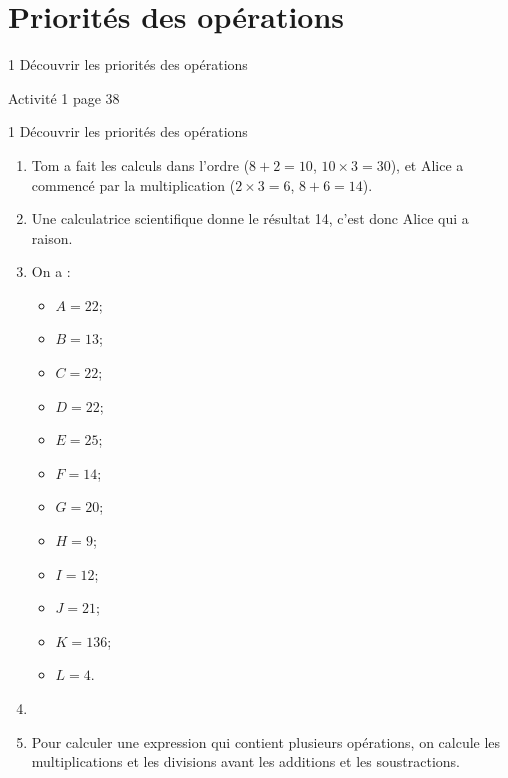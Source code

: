 \documentclass[12pt,a4paper]{article}
\date{}
\title{}
\begin{document}




\section{Priorités des opérations}

\begin{myact}{1 Découvrir les priorités des opérations}

	Activité 1 page 38
\end{myact}

\begin{myactrep}{1 Découvrir les priorités des opérations}
	
	\begin{enumerate}
		\item Tom a fait les calculs dans l'ordre ($8 + 2 = 10$, $10 \times 3 = 30$), et Alice a commencé par la multiplication ($2 \times 3 = 6$, $8 + 6 = 14$).
		
		\item Une calculatrice scientifique donne le résultat 14, c'est donc Alice qui a raison.
		
		\item On a :
		
		\begin{multicols}{4}
			\begin{itemize}
				\item $A = 22 $;
				\item $B = 13 $;
				\item $C = 22 $;
				\item $D = 22 $;
				\item $E = 25 $;
				\item $F = 14 $;
				\item $G = 20 $;
				\item $H = 9 $;
				\item $I = 12 $;
				\item $J = 21 $;
				\item $K = 136 $;
				\item $L = 4 $.
			\end{itemize}
		\end{multicols}
	
		\item 
		
		\item Pour calculer une expression qui contient plusieurs opérations, on calcule les multiplications et les divisions avant les additions et les soustractions.
	\end{enumerate}
\end{myactrep}
\end{document}
